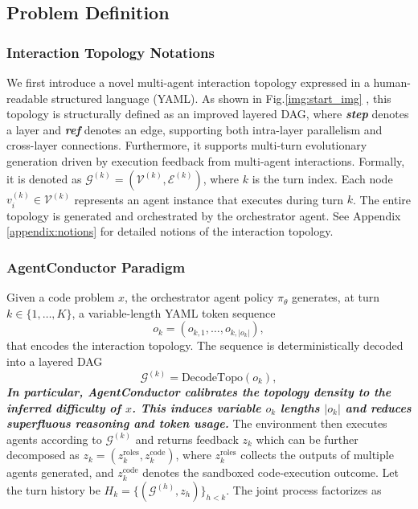 \documentclass{article}
\theoremstyle{definition}
\begin{document}
\subsection{Problem Definition}

\subsubsection{Interaction Topology Notations}
We first introduce a novel multi-agent interaction topology expressed in a human-readable structured language (YAML). As shown in Fig.\ref{img:start_img} , this topology is structurally defined as an improved layered DAG, where \textbf{\textit{step}} denotes a layer and \textbf{\textit{ref}} denotes an edge, supporting both intra-layer parallelism and cross-layer connections. Furthermore, it supports multi-turn evolutionary generation driven by execution feedback from multi-agent interactions. Formally, it is denoted as $\mathcal{G}^{(k)} = (\mathcal{V}^{(k)}, \mathcal{E}^{(k)})$, where $k$ is the turn index. 
Each node $v_{i}^{(k)} \in \mathcal{V}^{(k)}$ represents an agent instance that executes during turn $k$. 
The entire topology is generated and orchestrated by the orchestrator agent. See Appendix \ref{appendix:notions} for detailed notions of the interaction topology.

\subsubsection{AgentConductor Paradigm}
Given a code problem $x$, the orchestrator agent policy $\pi_\theta$ generates, at turn $k\in\{1,\dots,K\}$, a variable-length YAML token sequence \begin{equation}\label{eq:topo_seq}
o_k=(o_{k,1},\ldots,o_{k,|o_k|}), 
\end{equation} that encodes the interaction topology. The sequence is deterministically decoded into a layered DAG \begin{equation}
\mathcal{G}^{(k)} = \mathrm{DecodeTopo}(o_k),
\label{eq:decode-topo}
\end{equation} 
\textbf{\textit{In particular, AgentConductor calibrates the topology density to the inferred difficulty of $x$. This induces variable $o_k$ lengths $|o_k|$ and reduces superfluous reasoning and token usage.}}
The environment then executes agents according to $\mathcal{G}^{(k)}$ and returns feedback $z_k$ which can be further decomposed as $z_k=(z_k^{\text{roles}}, z_k^{\text{code}})$, where $z_k^{\text{roles}}$ collects the outputs of multiple agents generated, and $z_k^{\text{code}}$ denotes the sandboxed code-execution outcome. Let the turn history be $H_k=\{(\mathcal{G}^{(h)},z_h)\}_{h<k}$. The joint process factorizes as
\end{document}
